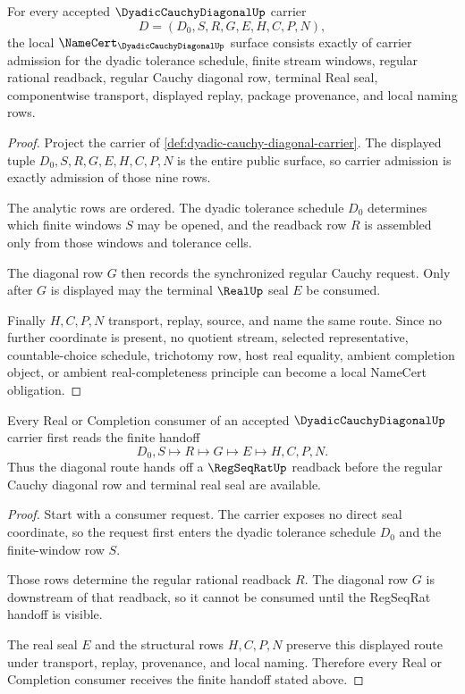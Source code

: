 \begin{theorem}
\label{thm:dyadic-cauchy-diagonal-namecert-obligations}
For every accepted $\DyadicCauchyDiagonalUp$ carrier
$$
D=(D_0,S,R,G,E,H,C,P,N),
$$
the local $\NameCert_{\DyadicCauchyDiagonalUp}$ surface consists exactly of carrier admission for the dyadic tolerance schedule, finite stream windows, regular rational readback, regular Cauchy diagonal row, terminal Real seal, componentwise transport, displayed replay, package provenance, and local naming rows.
\end{theorem}
\begin{proof}
Project the carrier of \autoref{def:dyadic-cauchy-diagonal-carrier}. The displayed tuple $D_0,S,R,G,E,H,C,P,N$ is the entire public surface, so carrier admission is exactly admission of those nine rows.

The analytic rows are ordered. The dyadic tolerance schedule $D_0$ determines which finite windows $S$ may be opened, and the readback row $R$ is assembled only from those windows and tolerance cells.

The diagonal row $G$ then records the synchronized regular Cauchy request. Only after $G$ is displayed may the terminal $\RealUp$ seal $E$ be consumed.

Finally $H,C,P,N$ transport, replay, source, and name the same route. Since no further coordinate is present, no quotient stream, selected representative, countable-choice schedule, trichotomy row, host real equality, ambient completion object, or ambient real-completeness principle can become a local NameCert obligation.
\end{proof}

\begin{theorem}
\label{thm:dyadic-cauchy-diagonal-regseqrat-handoff}
Every Real or Completion consumer of an accepted $\DyadicCauchyDiagonalUp$ carrier first reads the finite handoff
$$
D_0,S \longmapsto R \longmapsto G \longmapsto E \longmapsto H,C,P,N .
$$
Thus the diagonal route hands off a $\RegSeqRatUp$ readback before the regular Cauchy diagonal row and terminal real seal are available.
\end{theorem}
\begin{proof}
Start with a consumer request. The carrier exposes no direct seal coordinate, so the request first enters the dyadic tolerance schedule $D_0$ and the finite-window row $S$.

Those rows determine the regular rational readback $R$. The diagonal row $G$ is downstream of that readback, so it cannot be consumed until the RegSeqRat handoff is visible.

The real seal $E$ and the structural rows $H,C,P,N$ preserve this displayed route under transport, replay, provenance, and local naming. Therefore every Real or Completion consumer receives the finite handoff stated above.
\end{proof}

